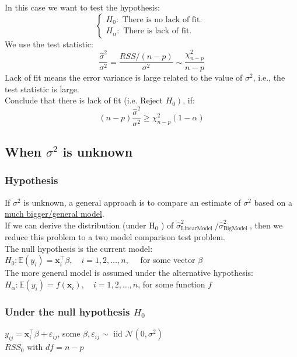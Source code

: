 \documentclass[11pt,a4paper]{article}
\begin{document}
In this case we want to test the hypothesis:
$$
\left\{\begin{array}{l}
H_{0}: \text { There is no lack of fit. } \\
H_{\alpha}: \text { There is lack of fit. }
\end{array}\right.
$$
We use the test statistic:
$$
\frac{\hat{\sigma}^{2}}{\sigma^{2}}=\frac{R S S /(n-p)}{\sigma^{2}} \sim \frac{\chi_{n-p}^{2}}{n-p}
$$
Lack of fit means the error variance is large related to the value of $\sigma^{2}$, i.e., the test statistic is large.\\
Conclude that there is lack of fit (i.e. Reject $\left.H_{0}\right)$, if:
$$
(n-p) \frac{\hat{\sigma}^{2}}{\sigma^{2}} \geq \chi_{n-p}^{2}(1-\alpha)
$$

\subsection{When $\sigma^2$ is unknown}
\subsubsection{Hypothesis}
If $\sigma^{2}$ is unknown, a general approach is to compare an estimate of $\sigma^{2}$ based on a \underline{much bigger/general model}.\\
If we can derive the distribution (under $\mathrm{H}_{0}$ ) of $\hat{\sigma}_{\text {LinearModel }}^{2} / \hat{\sigma}_{\text {BigModel }}^{2}$, then we reduce this problem to a two model comparison test problem.\\
The null hypothesis is the current model:\\
$H_{0}: \mathbb{E}\left(y_{i}\right)=\mathbf{x}_{i}^{\top} \beta, \quad i=1,2, \ldots, n, \quad$ for some vector $\beta$\\
The more general model is assumed under the alternative hypothesis:\\
$H_{\alpha}: \mathbb{E}\left(y_{i}\right)=f\left(\mathbf{x}_{i}\right), \quad i=1,2, \ldots, n$, \quad for some function $f$\\

\subsubsection{Under the null hypothesis $H_{0}$}
$y_{i j}=\mathbf{x}_{i}^{\top} \beta+\varepsilon_{i j}$, some $\beta, \varepsilon_{i j} \sim$ iid $\mathcal{N}\left(0, \sigma^{2}\right)$\\
$R S S_{0}$ with $d f=n-p$
\end{document}

